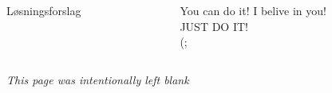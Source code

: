 \documentclass[final,hyperref={pdfpagelabels=false}]{beamer}
\begin{document}
\begin{frame}{}
\begin{columns}[t]
\begin{column}{.50\linewidth}
\begin{block}{Løsningsforslag}
{			}
			\end{block}
		\end{column}
		\begin{column}{.50\linewidth}
			\begin{block}{}
				\vspace{150mm}
			\end{block}
			\begin{block}{\center You can do it!}
				\center
				I belive in you!\\
				JUST DO IT!\\
				(;
			\end{block}
		\end{column}
	\end{columns}
\end{frame}{}
\begin{frame}{}
	\begin{columns}
		\begin{column}{1.0\linewidth}
			\footnotesize\center
			\textit{This page was intentionally left blank}
		\end{column}
	\end{columns}
\end{frame}{}
\end{document}
